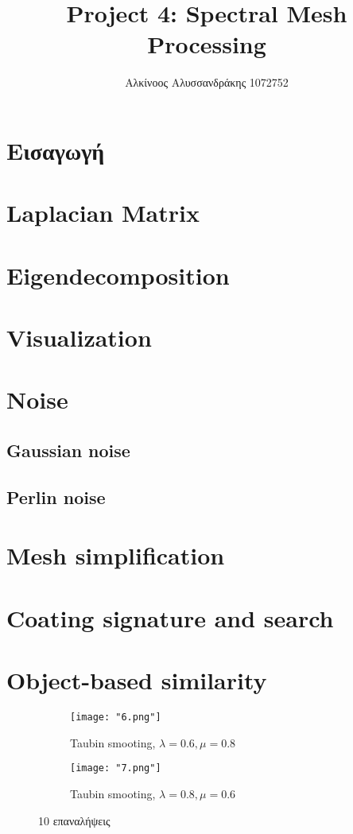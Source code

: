 \documentclass{article}
\title{Project 4: Spectral Mesh Processing}
\author{Αλκίνοος Αλυσσανδράκης 1072752}
\date{}
\begin{document}
\maketitle

\section{Εισαγωγή}

\section{Laplacian Matrix}


\section{Eigendecomposition}


\section{Visualization}


\section{Noise}

\subsection{Gaussian noise}

\subsection{Perlin noise}


\section{Mesh simplification}


\section{Coating signature and search}


\section{Object-based similarity}

\begin{figure}[h]
	\begin{subfigure}{0.5\textwidth}
		\texttt{[image: "6.png"]}
		\caption{Taubin smooting, $\lambda = 0.6, \mu = 0.8$}
	\end{subfigure}
	\begin{subfigure}{0.5\textwidth}
		\texttt{[image: "7.png"]}
		\caption{Taubin smooting, $\lambda = 0.8, \mu = 0.6$}
	\end{subfigure}
	\caption{10 επαναλήψεις}
\end{figure}
\end{document}
